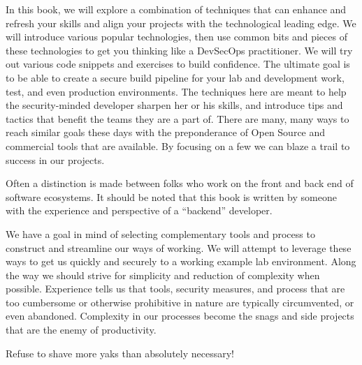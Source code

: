 \justify{}
In this book, we will explore a combination of techniques that can enhance and refresh
your skills and align your projects with the technological leading edge. We will
introduce various popular technologies, then use common bits and pieces of
these technologies to get you thinking like a DevSecOps practitioner. We will try out
various code snippets and exercises to build confidence. The ultimate goal is to be able to
create a secure build pipeline for your lab and development work,
test, and even production environments. The techniques here are meant to help
the security-minded developer sharpen her or his skills, and introduce tips
and tactics that benefit the teams they are a part of. There are many, many
ways to reach similar goals these days with the preponderance of Open Source
and commercial tools that are available. By focusing on a few we can blaze a
trail to success in our projects.

\justify{}
Often a distinction is made between folks
who work on the front and back end of software ecosystems. It should be noted that this
book is written by someone with the
experience and perspective of a ``backend'' developer.

\justify{}
We have a goal in mind of selecting complementary tools and process to construct
and streamline our ways of working. We will attempt to leverage these ways to
get us quickly and securely to a working example lab environment. Along the
way we should strive for simplicity and reduction of complexity when possible.
Experience tells us that tools, security measures, and process that are too cumbersome
or otherwise prohibitive in nature are typically circumvented, or even abandoned.
Complexity in our processes become the snags and side projects that are the
enemy of productivity.

\justify{}
Refuse to shave more yaks\cite{yak} than absolutely necessary!
